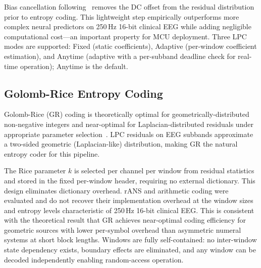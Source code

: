 \documentclass[journal]{IEEEtran}
\begin{document}
Bias cancellation following~\cite{sriraam2008} removes the DC offset
from the residual distribution prior to entropy coding. This
lightweight step empirically outperforms more complex neural
predictors on 250\,Hz 16-bit clinical EEG while adding negligible
computational cost---an important property for MCU deployment.
Three LPC modes are supported: Fixed (static coefficients),
Adaptive (per-window coefficient estimation), and Anytime (adaptive
with a per-subband deadline check for real-time operation); Anytime
is the default.

\subsection{Golomb-Rice Entropy Coding}
Golomb-Rice (GR) coding is theoretically optimal for
geometrically-distributed non-negative integers and near-optimal for
Laplacian-distributed residuals under appropriate parameter
selection~\cite{golomb1966,rice1979}. LPC residuals on EEG subbands
approximate a two-sided geometric (Laplacian-like) distribution,
making GR the natural entropy coder for this pipeline.

The Rice parameter $k$ is selected per channel per window from
residual statistics and stored in the fixed per-window header,
requiring no external dictionary. This design eliminates dictionary
overhead. rANS and arithmetic coding were evaluated and do not
recover their implementation overhead at the window sizes and
entropy levels characteristic of 250\,Hz 16-bit clinical EEG. This is consistent with the theoretical result that GR
achieves near-optimal coding efficiency for geometric sources with
lower per-symbol overhead than asymmetric numeral systems at short
block lengths. Windows are fully self-contained: no inter-window
state dependency exists, boundary effects are eliminated, and any
window can be decoded independently enabling random-access operation.
\end{document}
